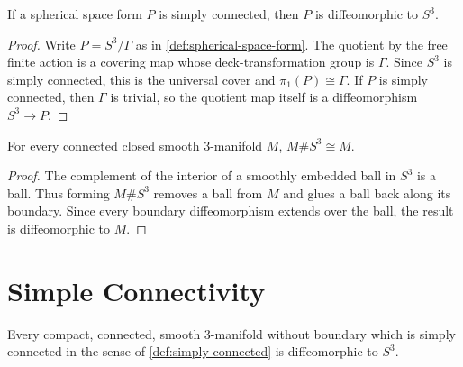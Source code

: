 \begin{lemma}
\label{lem:simply-connected-spherical-space-form}
\notready
If a spherical space form $P$ is simply connected, then $P$ is diffeomorphic
to $S^3$.
\end{lemma}

\begin{proof}
Write $P=S^3/\Gamma$ as in \ref{def:spherical-space-form}.  The quotient by
the free finite action is a covering map whose deck-transformation group is
$\Gamma$.  Since $S^3$ is simply connected, this is the universal cover and
$\pi_1(P)\cong\Gamma$.  If $P$ is simply connected, then $\Gamma$ is trivial,
so the quotient map itself is a diffeomorphism $S^3\to P$.
\end{proof}

\begin{lemma}
\label{lem:three-sphere-connected-sum-identity}
\notready
For every connected closed smooth $3$-manifold $M$,
$M\#S^3\cong M$.
\end{lemma}

\begin{proof}
The complement of the interior of a smoothly embedded ball in $S^3$ is a
ball.  Thus forming $M\#S^3$ removes a ball from $M$ and glues a ball back
along its boundary.  Since every boundary diffeomorphism extends over the
ball, the result is diffeomorphic to $M$.
\end{proof}

\section{Simple Connectivity}

\begin{theorem}
\label{thm:poincare-conjecture}
\notready
Every compact, connected, smooth $3$-manifold without boundary which is
simply connected in the sense of \ref{def:simply-connected} is diffeomorphic
to $S^3$.
\end{theorem}

